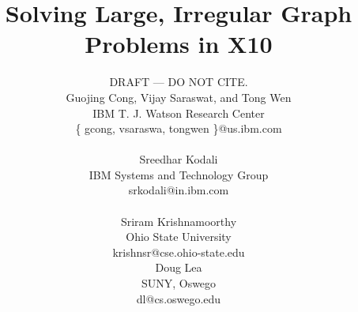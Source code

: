 \documentclass[10pt]{article}
\numberwithin{equation}{section}
\def\Xten{{\sf X10}}
\begin{document}
\title{Solving Large, Irregular Graph Problems in \Xten}

\author{
{\sc DRAFT --- DO NOT CITE.}\\
Guojing Cong,  Vijay Saraswat, and Tong Wen\\
IBM T. J. Watson Research Center\\
 \{ gcong, vsaraswa, tongwen \}@us.ibm.com\\ 
\vspace*{-2ex} \\
Sreedhar Kodali\\
IBM Systems and Technology Group\\
srkodali@in.ibm.com\\
\vspace*{-2ex} \\
Sriram Krishnamoorthy \\
Ohio State University\\
krishnsr@cse.ohio-state.edu
\vspace*{-3ex} \\
Doug Lea\\
SUNY, Oswego\\
dl@cs.oswego.edu\\
\vspace*{-3ex} \\
}

\date{}

\maketitle
\thispagestyle{empty}






%



{\footnotesize


}
\end{document}

